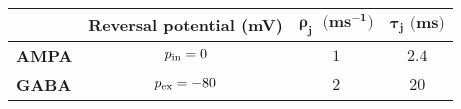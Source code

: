 \begin{tabular}{l|c|c|c|}
    \cline{2-4}
    \textbf{}                                                     & \cellcolor{table-color}\textbf{Reversal potential (mV)} & \cellcolor{table-color}\textbf{$\pmb{\rho_{j} \; \text{ (} ms^{-1} \text{)}}$} & \cellcolor{table-color}\textbf{$\pmb{\tau_{j} \text{ (} ms \text{)}}$} \\ \hline
    \multicolumn{1}{|l|}{\cellcolor{table-color}\textbf{AMPA}}   & $p_{\mathrm{in}} = 0$                                             & $1$                                                                              & $2.4$                                                                       \\ \hline
    \multicolumn{1}{|l|}{\cellcolor{table-color}\textbf{GABA}} & $p_{\mathrm{ex}} = -80$                                           & $2$                                                                              & $20$                                                                        \\ \hline
\end{tabular}